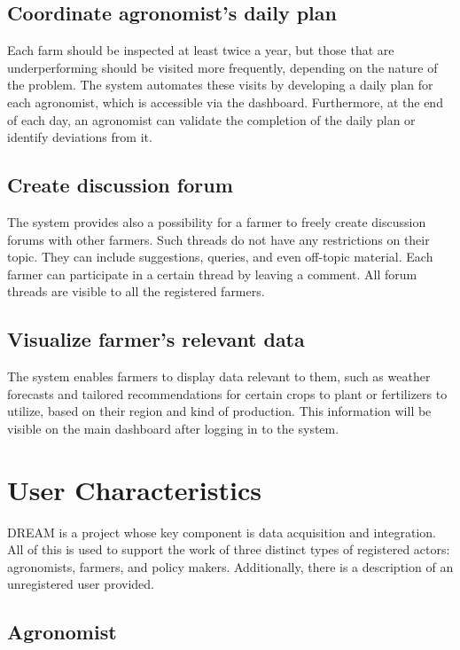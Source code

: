 \subsection{Coordinate agronomist's daily plan}

Each farm should be inspected at least twice a year, but those that are underperforming should be visited more frequently, depending on the nature of the problem. The system automates these visits by developing a daily plan for each agronomist, which is accessible via the dashboard. Furthermore, at the end of each day, an agronomist can validate the completion of the daily plan or identify deviations from it.

\subsection{Create discussion forum}

The system provides also a possibility for a farmer to freely create discussion forums with other farmers. Such threads do not have any restrictions on their topic. They can include suggestions, queries, and even off-topic material. Each farmer can participate in a certain thread by leaving a comment. All forum threads are visible to all the registered farmers.

\subsection{Visualize farmer's relevant data}

The system enables farmers to display data relevant to them, such as weather forecasts and tailored recommendations for certain crops to plant or fertilizers to utilize, based on their region and kind of production. This information will be visible on the main dashboard after logging in to the system.

\section{User Characteristics} \label{sec:user_characteristics}

DREAM is a project whose key component is data acquisition and integration. All of this is used to support the work of three distinct types of registered actors: agronomists, farmers, and policy makers. Additionally, there is a description of an unregistered user provided.

\subsection{Agronomist}

